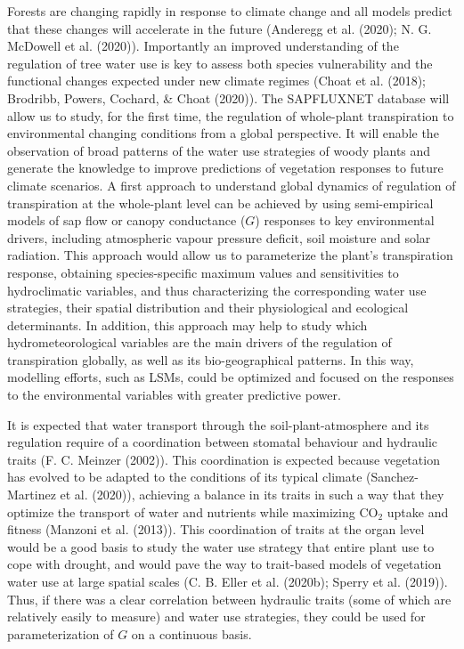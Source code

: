 \documentclass[11pt,twoside]{reedthesis}
\begin{document}
Forests are changing rapidly in response to climate change and all
models predict that these changes will accelerate in the future
(Anderegg et al. (2020); N. G. McDowell et al. (2020)). Importantly an
improved understanding of the regulation of tree water use is key to
assess both species vulnerability and the functional changes expected
under new climate regimes (Choat et al. (2018); Brodribb, Powers,
Cochard, \& Choat (2020)). The SAPFLUXNET database will allow us to
study, for the first time, the regulation of whole-plant transpiration
to environmental changing conditions from a global perspective. It will
enable the observation of broad patterns of the water use strategies of
woody plants and generate the knowledge to improve predictions of
vegetation responses to future climate scenarios. A first approach to
understand global dynamics of regulation of transpiration at the
whole-plant level can be achieved by using semi-empirical models of sap
flow or canopy conductance (\(G\)) responses to key environmental
drivers, including atmospheric vapour pressure deficit, soil moisture
and solar radiation. This approach would allow us to parameterize the
plant's transpiration response, obtaining species-specific maximum
values and sensitivities to hydroclimatic variables, and thus
characterizing the corresponding water use strategies, their spatial
distribution and their physiological and ecological determinants. In
addition, this approach may help to study which hydrometeorological
variables are the main drivers of the regulation of transpiration
globally, as well as its bio-geographical patterns. In this way,
modelling efforts, such as LSMs, could be optimized and focused on the
responses to the environmental variables with greater predictive
power.\par

It is expected that water transport through the soil-plant-atmosphere
and its regulation require of a coordination between stomatal behaviour
and hydraulic traits (F. C. Meinzer (2002)). This coordination is
expected because vegetation has evolved to be adapted to the conditions
of its typical climate (Sanchez-Martinez et al. (2020)), achieving a
balance in its traits in such a way that they optimize the transport of
water and nutrients while maximizing \(\text{CO}_2\) uptake and fitness
(Manzoni et al. (2013)). This coordination of traits at the organ level
would be a good basis to study the water use strategy that entire plant
use to cope with drought, and would pave the way to trait-based models
of vegetation water use at large spatial scales (C. B. Eller et al.
(2020b); Sperry et al. (2019)). Thus, if there was a clear correlation
between hydraulic traits (some of which are relatively easily to
measure) and water use strategies, they could be used for
parameterization of \(G\) on a continuous basis.\par
\end{document}
